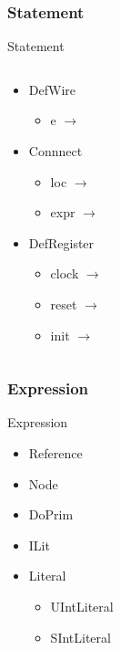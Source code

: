 \begin{frame}
  \frametitle{Statement}

  \begin{block}{Statement}
    \begin{columns}
      \begin{column}{0.5\textwidth}
        \begin{itemize}
          \item {DefWire}
            \begin{itemize}
              \item e \(\rightarrow\) 
            \end{itemize}
          \item{Connnect}
            \begin{itemize}
              \item loc \(\rightarrow\) 
              \item expr \(\rightarrow\) 
            \end{itemize}
          \item{DefRegister}
            \begin{itemize}
              \item clock \(\rightarrow\) 
              \item reset \(\rightarrow\) 
              \item init  \(\rightarrow\) 
            \end{itemize}
        \end{itemize}
      \end{column}
      \begin{column}{0.5\textwidth}
      \end{column}
    \end{columns}

  \end{block}

\end{frame}

\begin{frame}
  \frametitle{Expression}

  \begin{block}{Expression}
    \begin{itemize}
      \item Reference
      \item Node
      \item DoPrim
      \item ILit
      \item Literal
        \begin{itemize}
          \item UIntLiteral
          \item SIntLiteral
        \end{itemize}
    \end{itemize}
  \end{block}

\end{frame}

